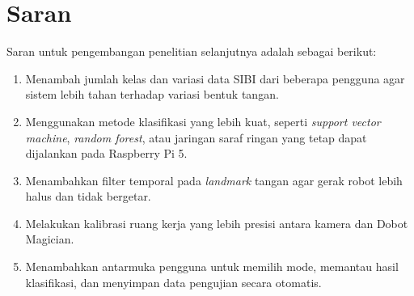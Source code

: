 \section{Saran}
Saran untuk pengembangan penelitian selanjutnya adalah sebagai berikut:
\begin{enumerate}[label=\arabic*.]
    \item Menambah jumlah kelas dan variasi data SIBI dari beberapa pengguna agar sistem lebih tahan terhadap variasi bentuk tangan.
    \item Menggunakan metode klasifikasi yang lebih kuat, seperti \textit{support vector machine}, \textit{random forest}, atau jaringan saraf ringan yang tetap dapat dijalankan pada Raspberry Pi 5.
    \item Menambahkan filter temporal pada \textit{landmark} tangan agar gerak robot lebih halus dan tidak bergetar.
    \item Melakukan kalibrasi ruang kerja yang lebih presisi antara kamera dan Dobot Magician.
    \item Menambahkan antarmuka pengguna untuk memilih mode, memantau hasil klasifikasi, dan menyimpan data pengujian secara otomatis.
\end{enumerate}
